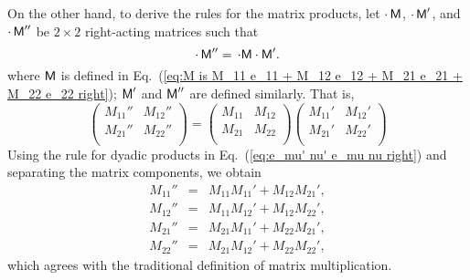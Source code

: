 \documentclass[11pt,twocolumn]{article}
\begin{document}
On the other hand, to derive the rules for the matrix products, let $\cdot\,\textsf M$, $\cdot\,\textsf M'$, and $\cdot\,\textsf M''$ be $2\times 2$  right-acting matrices such that
\begin{equation}
\label{eq:M'' is M M'}
\cdot\,\textsf M''=\,\cdot\textsf M\cdot\textsf M'.
\end{equation}
where $\textsf M$ is defined in Eq.~(\ref{eq:M is M_11 e_11 + M_12 e_12 + M_21 e_21 + M_22 e_22 right}); $\textsf M'$ and $\textsf M''$ are defined similarly.  That is,
\begin{equation}
\label{eq:M'' is M M' matrix form}
\begin{pmatrix}
M_{11}''&M_{12}''\\
M_{21}''&M_{22}''\\
\end{pmatrix}
=
\begin{pmatrix}
M_{11}&M_{12}\\
M_{21}&M_{22}\\
\end{pmatrix}
\begin{pmatrix}
M_{11}'&M_{12}'\\
M_{21}'&M_{22}'\\
\end{pmatrix}
\end{equation}
Using the rule for dyadic products in Eq.~(\ref{eq:e_mu' nu' e_mu nu right}) and separating the matrix components, we obtain
\begin{eqnarray}
\label{eq:M'' is M M' e_11 part}
M_{11}''&=&M_{11}M_{11}'+M_{12}M_{21}',\\
\label{eq:M'' is M M' e_12 part}
M_{12}''&=&M_{11}M_{12}'+M_{12}M_{22}',\\
\label{eq:M'' is M M' e_21 part}
M_{21}''&=&M_{21}M_{11}'+M_{22}M_{21}',\\
\label{eq:M'' is M M' e_22 part}
M_{22}''&=&M_{21}M_{12}'+M_{22}M_{22}',
\end{eqnarray}
which agrees with the traditional definition of matrix multiplication.
\end{document}
